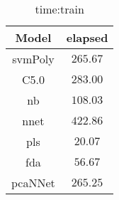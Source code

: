 \begin{table}[!ht]
	\centering
	\begin{tabular}{|c|c|}
		\hline
		Model & elapsed \\ \hline
		svmPoly & $265.67$ \\ \hline
		C5.0 & $283.00$ \\ \hline
		nb & $108.03$ \\ \hline
		nnet & $422.86$ \\ \hline
		pls & $20.07$ \\ \hline
		fda & $56.67$ \\ \hline
		pcaNNet & $265.25$ \\ \hline
	\end{tabular}
	\caption{time:train}
	\label{tab:time:train}
\end{table}
